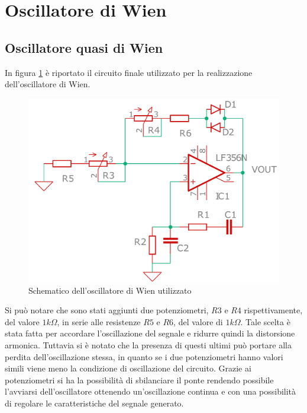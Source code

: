 \documentclass[titlepage]{report}
\begin{document}
\newpage
\section{Oscillatore di Wien}
\label{sc: oscillatore wien sperimentale}

	\subsection{Oscillatore quasi di Wien}
	\label{subsc: wien sbagliato}

	In figura \ref{sch:osc_wien} è riportato il circuito finale utilizzato per la realizzazione dell'oscillatore di Wien.

	\begin{figure}[H]
		\centering
		\includegraphics[scale=0.5]{Immagini/sch_osc_wien_cad.pdf}
		\caption{Schematico dell'oscillatore di Wien utilizzato}
		\label{sch:osc_wien}
	\end{figure}

	Si può notare che sono stati aggiunti due potenziometri, $R3$ e $R4$ rispettivamente, del valore  $1k\Omega$,  in serie alle resistenze $R5$ e $R6$, del valore di  $1k\Omega$. Tale scelta è stata fatta per accordare l'oscillazione del segnale e ridurre quindi la distorsione armonica. Tuttavia si è notato che la presenza di questi ultimi può portare alla perdita dell'oscillazione stessa, in quanto se i due potenziometri hanno valori simili viene meno la condizione di oscillazione del circuito. Grazie ai potenziometri  si ha la possibilità di sbilanciare il ponte rendendo possibile l'avviarsi dell'oscillatore ottenendo un'oscillazione continua e con una possibilità di regolare le caratteristiche del segnale generato.
\end{document}
